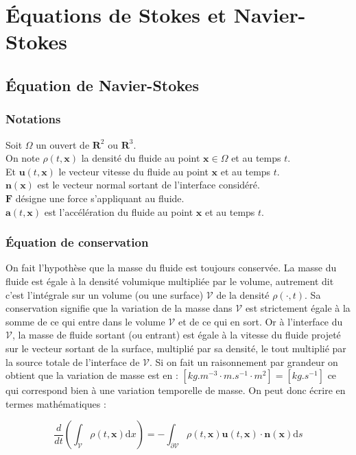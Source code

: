 \section{Équations de Stokes et Navier-Stokes}

\subsection{Équation de Navier-Stokes}
\subsubsection{Notations}
Soit $\Omega$ un ouvert de $\mathbf{R}^2$ ou $\mathbf{R}^3 $. \\
On note $\rho(t, \textbf{x})$ la densité du fluide au point $\textbf{x} \in \Omega$ et au temps $t$.\\
Et $\textbf{u}(t, \textbf{x})$ le vecteur vitesse du fluide au point $\textbf{x}$ et au temps $t$. \\
$\textbf{n}(\textbf{x}) $ est le vecteur normal sortant de l’interface considéré.\\
$\mathbf{F}$ désigne une force s'appliquant au fluide. \\
$\mathbf{a}(t, \mathbf{x})$ est l'accélération du fluide au point $\textbf{x}$ et au temps $t$. \\
\subsubsection{Équation de conservation}
On fait l'hypothèse que la masse du fluide est toujours conservée. La masse du fluide est égale à la densité volumique multipliée par le volume, autrement dit c'est l'intégrale sur un volume (ou une surface) $\mathcal{V}$ de la densité $\rho(\cdot, t)$.
Sa conservation signifie que la variation de la masse dans $\mathcal{V}$ est strictement égale à la somme de ce qui entre dans le volume $\mathcal{V}$ et de ce qui en sort.
Or à l'interface du $\mathcal{V}$, la masse de fluide sortant (ou entrant) est égale à la vitesse du fluide projeté sur le vecteur sortant de la surface, multiplié par sa densité, le tout multiplié par la source totale de l'interface de $\mathcal{V}$.
Si on fait un raisonnement par grandeur on obtient que la variation de masse est en :
$\left[ kg.m^{-3} \cdot m.s^{-1} \cdot m^2 \right] = \left[ kg.s^{-1} \right] $ ce qui correspond bien à une variation temporelle de masse.
On peut donc écrire en termes mathématiques : 

\begin{equation}\label{MassCons}
\frac{d}{d t}\left(\int_{\mathcal{V}} \rho(t, \mathbf{x}) \mathrm{d} x\right)=-\int_{\partial \mathcal{V}} \rho(t, \mathbf{x}) \mathbf{u}(t, \mathbf{x}) \cdot \mathbf{n}(\mathbf{x}) \mathrm{d}s
\end{equation}


